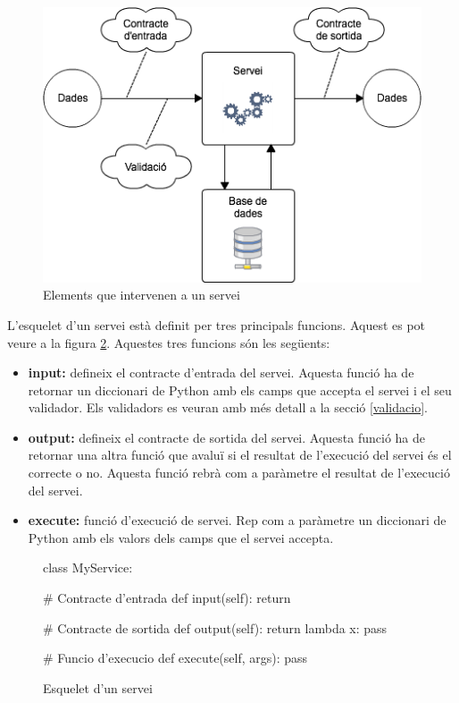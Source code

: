 	\begin{figure}[h!]
		\includegraphics[scale=0.5]{img/servei.png}
   		\centering
    	\caption{Elements que intervenen a un servei}
   	 	\label{fig:servei}
	\end{figure}
	
	L'esquelet d'un servei està definit per tres principals funcions. Aquest es pot veure a la figura \ref{fig:esquelet_servei}. Aquestes tres funcions són les següents:
	
	\begin{itemize}
		\item \textbf{input:} defineix el contracte d'entrada del servei. Aquesta funció ha de retornar un diccionari de Python amb els camps que accepta el servei i el seu validador. Els validadors es veuran amb més detall a la secció \ref{validacio}.
		 
		\item \textbf{output:} defineix el contracte de sortida del servei. Aquesta funció ha de retornar una altra funció que avaluï si el resultat de l'execució del servei és el correcte o no. Aquesta funció rebrà com a paràmetre el resultat de l'execució del servei.
		
		\item \textbf{execute:} funció d'execució de servei. Rep com a paràmetre un diccionari de Python amb els valors dels camps que el servei accepta.
	\end{itemize}
	
	\begin{figure}[h!]
		\begin{python}
class MyService:
	
	# Contracte d'entrada
	def input(self):
		return {}
	
	# Contracte de sortida
	def output(self):
		return lambda x: pass
		
	# Funcio d'execucio
	def execute(self, args):
		pass
		\end{python}
		\caption{Esquelet d'un servei}
		\label{fig:esquelet_servei}
	\end{figure}
	
